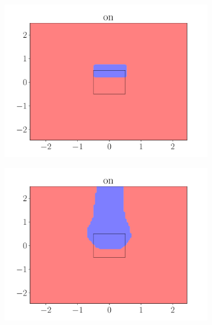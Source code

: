 \begin{figure}[ht]
\begin{subfigure}{0.45\textwidth}
            \includegraphics[width=\textwidth]{figures/on_rule.pdf}
        \end{subfigure}
        \begin{subfigure}{0.45\textwidth}
            \centering
            \includegraphics[width=\textwidth]{figures/on_predicate_only.pdf}
        \end{subfigure}
        \begin{subfigure}{0.45\textwidth}
            \centering

\end{subfigure}
\end{figure}
